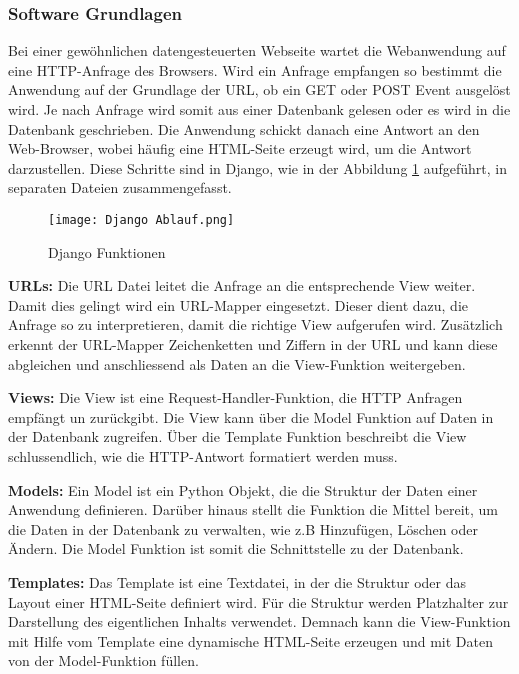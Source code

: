  \newpage
\subsubsection{Software Grundlagen}\label{subsubsec:SoftwareGrundlagen}
Bei einer gewöhnlichen datengesteuerten Webseite wartet die Webanwendung auf eine HTTP-Anfrage des Browsers. Wird ein Anfrage empfangen so bestimmt die Anwendung auf der Grundlage der URL, ob ein GET oder POST Event ausgelöst wird. Je nach Anfrage wird somit aus einer Datenbank gelesen oder es wird in die Datenbank geschrieben. Die Anwendung schickt danach eine Antwort an den Web-Browser, wobei häufig eine HTML-Seite erzeugt wird, um die Antwort darzustellen. Diese Schritte sind in Django, wie in der Abbildung \ref{fig:DjangoAblauf} aufgeführt,  in separaten Dateien zusammengefasst.
\begin{figure} [H]
	\centering
	\texttt{[image: Django Ablauf.png]}
	\caption{Django Funktionen}
	\label{fig:DjangoAblauf}
\end{figure}

\textbf{URLs: }
Die URL Datei leitet die Anfrage an die entsprechende View weiter. Damit dies gelingt wird ein URL-Mapper eingesetzt. Dieser dient dazu, die Anfrage so zu interpretieren, damit die richtige View aufgerufen wird. Zusätzlich erkennt der URL-Mapper Zeichenketten und Ziffern in der URL und kann diese abgleichen und anschliessend als Daten an die View-Funktion weitergeben.

\textbf{Views: }
Die View ist eine Request-Handler-Funktion, die HTTP Anfragen empfängt un zurückgibt. Die View kann über die Model Funktion auf Daten in der Datenbank zugreifen. Über die Template Funktion beschreibt die View schlussendlich, wie die HTTP-Antwort formatiert werden muss.

\textbf{Models: }
Ein Model ist ein Python Objekt, die die Struktur der Daten einer Anwendung definieren. Darüber hinaus stellt die Funktion die Mittel bereit, um die Daten in der Datenbank zu verwalten, wie z.B Hinzufügen, Löschen oder Ändern. Die Model Funktion ist somit die Schnittstelle zu der Datenbank.

\textbf{Templates: }
Das Template ist eine Textdatei, in der die Struktur oder das Layout einer HTML-Seite definiert wird. Für die Struktur werden Platzhalter zur Darstellung des eigentlichen Inhalts  verwendet. Demnach kann die View-Funktion mit Hilfe vom Template eine dynamische HTML-Seite erzeugen und mit Daten von der Model-Funktion füllen.

